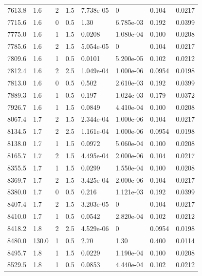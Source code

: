 \documentclass[preview]{standalone}
\begin{document}
{{{{\begin{tabular}{L{1.2cm}C{1.2cm} C{0.3cm}C{0.5cm} C{1.4cm}C{1.4cm} C{1.4cm}C{1.4cm}}
  7613.8  &   1.6  & 2     & 1.5 &  7.738e-05  & 0  & 0.104 &  0.0217   \\ 
  7715.6  &   1.6  & 0     & 0.5 &  1.30  & 6.785e-03  & 0.192 &  0.0399   \\ 
  7775.0  &   1.6  & 1     & 1.5 &  0.0208  & 1.080e-04  & 0.100 &  0.0208   \\ 
  7785.6  &   1.6  & 2     & 1.5 &  5.054e-05  & 0  & 0.104 &  0.0217   \\ 
  7809.6  &   1.6  & 1     & 0.5 &  0.0101  & 5.200e-05  & 0.102 &  0.0212   \\ 
  7812.4  &   1.6  & 2     & 2.5 &  1.049e-04  & 1.000e-06  & 0.0954 &  0.0198   \\ 
  7813.0  &   1.6  & 0     & 0.5 &  0.502  & 2.610e-03  & 0.192 &  0.0399   \\ 
  7889.3  &   1.6  & 1     & 0.5 &  0.197  & 1.024e-03  & 0.179 &  0.0372   \\ 
  7926.7  &   1.6  & 1     & 1.5 &  0.0849  & 4.410e-04  & 0.100 &  0.0208   \\ 
  8067.4  &   1.7  & 2     & 1.5 &  2.344e-04  & 1.000e-06  & 0.104 &  0.0217   \\ 
  8134.5  &   1.7  & 2     & 2.5 &  1.161e-04  & 1.000e-06  & 0.0954 &  0.0198   \\ 
  8138.0  &   1.7  & 1     & 1.5 &  0.0972  & 5.060e-04  & 0.100 &  0.0208   \\ 
  8165.7  &   1.7  & 2     & 1.5 &  4.495e-04  & 2.000e-06  & 0.104 &  0.0217   \\ 
  8355.5  &   1.7  & 1     & 1.5 &  0.0299  & 1.550e-04  & 0.100 &  0.0208   \\ 
  8369.7  &   1.7  & 2     & 1.5 &  3.425e-04  & 2.000e-06  & 0.104 &  0.0217   \\ 
  8380.0  &   1.7  & 0     & 0.5 &  0.216  & 1.121e-03  & 0.192 &  0.0399   \\ 
  8407.4  &   1.7  & 2     & 1.5 &  3.203e-05  & 0  & 0.104 &  0.0217   \\ 
  8410.0  &   1.7  & 1     & 0.5 &  0.0542  & 2.820e-04  & 0.102 &  0.0212   \\ 
  8418.2  &   1.8  & 2     & 2.5 &  4.529e-06  & 0  & 0.0954 &  0.0198   \\ 
  8480.0  &  130.0  & 1     & 0.5 &  2.70  & 1.30  & 0.400 &  0.0114   \\ 
  8495.7  &   1.8  & 1     & 1.5 &  0.0229  & 1.190e-04  & 0.100 &  0.0208   \\ 
  8529.5  &   1.8  & 1     & 0.5 &  0.0853  & 4.440e-04  & 0.102 &  0.0212   \\ 

\end{tabular}}}}}
\end{document}
